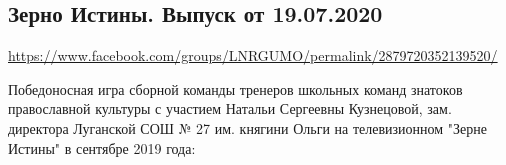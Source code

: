  
 
  
\subsection{Зерно Истины. Выпуск от 19.07.2020}
\label{sec:26_07_2020.fb.lnr.1}
\url{https://www.facebook.com/groups/LNRGUMO/permalink/2879720352139520/}

Победоносная игра сборной команды тренеров школьных команд знатоков
православной культуры с участием Натальи Сергеевны Кузнецовой, зам. директора
Луганской СОШ № 27 им. княгини Ольги на телевизионном "Зерне Истины" в сентябре
2019 года:
